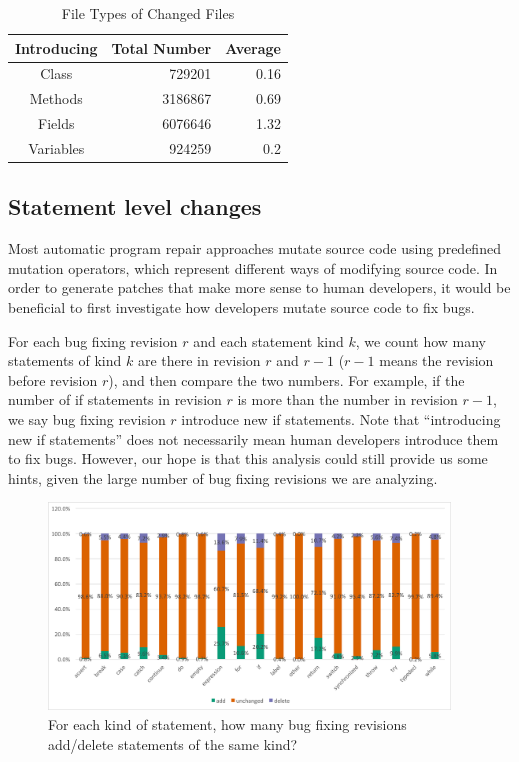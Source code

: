 \documentclass{sig-alternate-05-2015}
\newcommand{\todo}[1]
  {{\scriptsize \textbf{\color{red} {#1}}}}
\begin{document}
\begin{table}
\centering
  \begin{tabular}{| c | r | r |}
  \hline
  Introducing & Total Number & Average \\ \hline \hline
  Class & 729201 & 0.16 \\ \hline
  Methods & 3186867 & 0.69 \\ \hline
  Fields & 6076646 & 1.32 \\ \hline
  Variables & 924259 & 0.2 \\ \hline
  \end{tabular}
  \caption{File Types of Changed Files}
  \label{tbl:new}
\end{table}



\subsection{Statement level changes}

Most automatic program repair approaches mutate source code using predefined
mutation operators, which represent different ways of modifying source code. In
order to generate patches that make more sense to human developers, it would be
beneficial to first investigate how developers mutate source code to fix bugs. 

For each bug fixing revision $r$ and each statement kind $k$, we count how many
statements of kind $k$ are there in revision $r$ and $r-1$ ($r-1$ means the
revision before revision $r$), and then compare the two numbers. For example, if
the number of if statements in revision $r$ is more than the number in revision
$r-1$, we say bug fixing revision $r$ introduce new if statements. Note that
``introducing new if statements'' does not necessarily mean human developers
introduce them to fix bugs. However, our hope is that this analysis could still
provide us some hints, given the large number of bug fixing revisions we are
analyzing.

\begin{figure}[!t] \centering
	\includegraphics[width=0.95\textwidth]{StmtType} \caption{For each kind
	of statement, how many bug fixing revisions add/delete statements of the
same kind?} \label{fig:StmtType} \end{figure}
\end{document}
